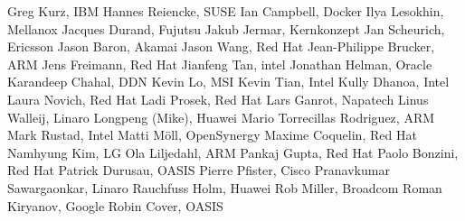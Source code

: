 Greg Kurz,	IBM	\newline
Hannes Reiencke, SUSE	\newline
Ian Campbell,	Docker	\newline
Ilya Lesokhin,	Mellanox	\newline
Jacques Durand,	Fujutsu	\newline
Jakub Jermar,	Kernkonzept	\newline
Jan Scheurich,	Ericsson	\newline
Jason Baron,	Akamai	\newline
Jason Wang, Red Hat \newline
Jean-Philippe Brucker,	ARM	\newline
Jens Freimann, Red Hat \newline
Jianfeng Tan,	intel	\newline
Jonathan Helman,	Oracle	\newline
Karandeep Chahal,	DDN	\newline
Kevin Lo,	MSI	\newline
Kevin Tian,	Intel	\newline
Kully Dhanoa,	Intel	\newline
Laura Novich, Red Hat	\newline
Ladi Prosek,	Red Hat	\newline
Lars Ganrot,	Napatech	\newline
Linus Walleij, Linaro \newline
Longpeng (Mike),	Huawei	\newline
Mario Torrecillas Rodriguez,	ARM	\newline
Mark Rustad,	Intel	\newline
Matti Möll, OpenSynergy \newline
Maxime Coquelin,	Red Hat	\newline
Namhyung Kim,	LG	\newline
Ola Liljedahl,	ARM	\newline
Pankaj Gupta,	Red Hat	\newline
Paolo Bonzini, Red Hat \newline
Patrick Durusau,	OASIS	\newline
Pierre Pfister,	Cisco	\newline
Pranavkumar Sawargaonkar,	Linaro	\newline
Rauchfuss Holm,	Huawei	\newline
Rob Miller,	Broadcom	\newline
Roman Kiryanov,	Google	\newline
Robin Cover,	OASIS	\newline
